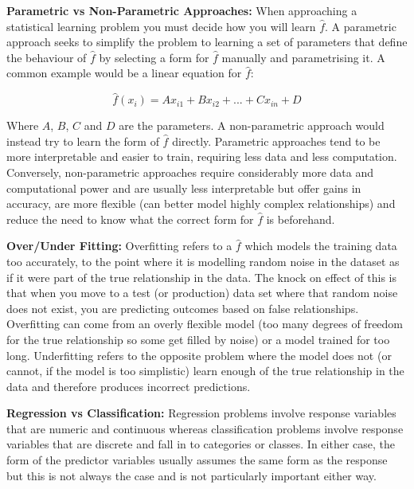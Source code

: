 \textbf{Parametric vs Non-Parametric Approaches:} When approaching a statistical learning problem you must decide how you will learn $\hat{f}$. A parametric approach seeks to simplify the problem to learning a set of parameters that define the behaviour of $\hat{f}$ by selecting a form for $\hat{f}$ manually and parametrising it. A common example would be a linear equation for $\hat{f}$:

$$ \hat{f}(x_{i}) = A x_{i1} + B x_{i2} + ... + C x_{in} + D $$

Where $A$, $B$, $C$ and $D$ are the parameters. A non-parametric approach would instead try to learn the form of $\hat{f}$ directly. Parametric approaches tend to be more interpretable and easier to train, requiring less data and less computation. Conversely, non-parametric approaches require considerably more data and computational power and are usually less interpretable but offer gains in accuracy, are more flexible (can better model highly complex relationships) and reduce the need to know what the correct form for $\hat{f}$ is beforehand.

\textbf{Over/Under Fitting:} Overfitting refers to a $\hat{f}$ which models the training data too accurately, to the point where it is modelling random noise in the dataset as if it were part of the true relationship in the data. The knock on effect of this is that when you move to a test (or production) data set where that random noise does not exist, you are predicting outcomes based on false relationships. Overfitting can come from an overly flexible model (too many degrees of freedom for the true relationship so some get filled by noise) or a model trained for too long. Underfitting refers to the opposite problem where the model does not (or cannot, if the model is too simplistic) learn enough of the true relationship in the data and therefore produces incorrect predictions.

\textbf{Regression vs Classification:} Regression problems involve response variables that are numeric and continuous whereas classification problems involve response variables that are discrete and fall in to categories or classes. In either case, the form of the predictor variables usually assumes the same form as the response but this is not always the case and is not particularly important either way.


